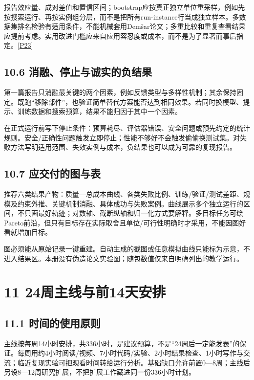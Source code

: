 报告效应量、成对差值和置信区间；bootstrap应按真正独立单位重采样，例如先按搜索运行、再按实例组分层，而不是把所有run-instance行当成独立样本。多数据集排名检验有适用条件，不能机械套用Demšar论文；多重比较和重复查看结果应提前考虑。实用改进门槛应来自应用容忍度或成本，而不是为了显著而事后指定。\href{https://jmlr.org/papers/v7/demsar06a.html}{{[}P23{]}}

\subsection{10.6
消融、停止与诚实的负结果}\label{ux6d88ux878dux505cux6b62ux4e0eux8bdaux5b9eux7684ux8d1fux7ed3ux679c}

第一篇报告只消融最关键的两个因素，例如反馈类型与多样性机制；其余保持固定。既跑``移除部件''，也验证简单替代方案能否达到相同效果。若同时换模型、提示、训练数据和搜索预算，结果不能归因于其中一个因素。

在正式运行前写下停止条件：预算耗尽、评估器错误、安全问题或预先约定的统计规则。安全/正确性问题触发立即停止；性能不够好不会触发偷偷换测试集。对失败方法写明适用范围、失效实例与成本，负结果也可以成为可靠的复现报告。

\subsection{10.7
应交付的图与表}\label{ux5e94ux4ea4ux4ed8ux7684ux56feux4e0eux8868}

推荐六类结果产物：质量---总成本曲线、各类失败比例、训练/验证/测试差距、规模及约束外推、关键机制消融、具体成功与失败案例。曲线展示多个独立运行的区间，不只画最好轨迹；对数轴、截断纵轴和归一化方式要解释。多目标任务可绘Pareto前沿，但只有目标存在实际取舍且单位/可行性明确时才采用，不能因图好看就增加目标。

图必须能从原始记录一键重建。自动生成的截图或任意模拟曲线只能标为示意，不进入结果区。本册没有伪造论文实验图；随包数值仅来自明确列出的教学运行。

\section{11
24周主线与前14天安排}\label{ux5468ux4e3bux7ebfux4e0eux524d14ux5929ux5b89ux6392}

\subsection{11.1
时间的使用原则}\label{ux65f6ux95f4ux7684ux4f7fux7528ux539fux5219}

主线按每周14小时安排，共336小时，是建议预算，不是``24周后一定能发表''的保证。每周用约4小时阅读/视频、7小时代码/实验、2小时结果检查、1小时写作与交流；临近复现实验可把观看时间转给运行分析。基础缺口允许前置0---8周；主线后另设8---12周研究扩展，不把扩展工作藏进同一份336小时计划。

